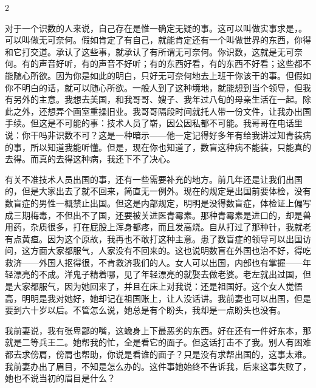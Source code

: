 2 

对于一个识数的人来说，自己存在是惟一确定无疑的事。这可以叫做实事求是，。可以叫做无可奈何。假如肯定了有自己，就能肯定还有一个叫做世界的东西，你得和它打交道。承认了这些事，就承认了有所谓无可奈何。你识数，这就是无可奈何。有的声音好听，有的声音不好听；有的东西好看，有的东西不好看；这些都不能随心所欲。因为你是如此的明白，只好无可奈何地去上班干你该干的事。但假如你不明白的话，就可以随心所欲。一般人到了这种境地，就能想到当个领导，但我有另外的主意。我想去美国，和我哥哥、嫂子、我年过八旬的母亲生活在一起。除此之外，还想弄个画室重操旧业。我哥哥隔段时间就托人带一份文件，让我办出国手续。但这是不可能的事：技术人员了崭，因公因私都不可能。我哥哥在电话里说：你干吗非识数不可？这是一种暗示——他一定记得好多年有给我讲过知青装病的事，所以知道我能听懂。但是，现在你也知道了，数盲这种病不能装，只能真的去得。而真的去得这种病，我还下不了决心。 

有关不准技术人员出国的事，还有一些需要补充的地方。前几年还是让我们出国的，但是大家出去了就不回来，简直无一例外。现在的规定是出国前要体检，没有数盲症的男性一概禁止出国。但这是内部规定，明明是没得数盲症，体检证上偏写成三期梅毒，不但出不了国，还要被关进医青霉素。那种青霉素是进口的，却是兽用药，杂质很多，打在屁股上浑身都疼，而且发高烧。自从打过了那种针，我就老有点黄疸。因为这个原故，我再也不敢打这种主意。患了数盲症的领导可以出国访问，这方面大家都服气，人家没有不回来的。这也说明数盲在外国也治不好，得吃救济——外国人抠得很，不肯救济我们的人。女人可以出国，内部也有掌握——年轻漂亮的不成。洋鬼子精着哪，见了年轻漂亮的就娶去做老婆。老左就出过国，但是大家都服气，因为她回来了，并且在床上对我说：还是祖国好。这个女人觉悟高，明明是我对她好，她却记在祖国账上，让人没话讲。我前妻也可以出国，但是要到六十岁以后。不管怎么说，她总是有个盼头，我却是一点盼头也没有。 

我前妻说，我有张卑鄙的嘴，这蝓身上下最恶劣的东西。好在还有一件好东本，那就是二等兵王二。她帮我的忙，全是看它的面子。但这话打击不了我。别人有困难都去求傍肩，傍肩也帮助，你说是看谁的面子？只是没有求帮出国的，这事太难。我前妻办出了眉目，不知是怎么办的。这件事她始终不告诉我，后来这事失败了，她也不说当初的眉目是什么？ 

